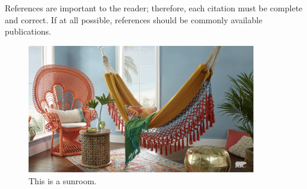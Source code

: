 \documentclass[letterpaper, 10 pt, conference]{ieeeconf}  %
\begin{document}

References are important to the reader; therefore, each citation must be complete and correct. If at all possible, references should be commonly available publications.

\onecolumn
\begin{figure}[htp]
\centering
\includegraphics[width=10cm]{sunroom.jpeg}
\caption{This is a sunroom.}
\label{fig:sunroom}
\end{figure}
\twocolumn
\end{document}
